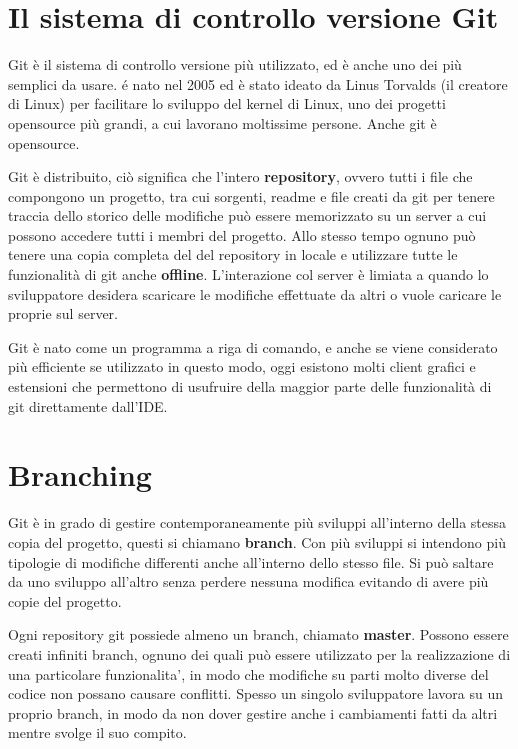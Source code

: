 \documentclass{article} \usepackage[textwidth=18cm,textheight=18cm]{geometry}
\begin{document}
\section{Il sistema di controllo versione Git}

Git è il sistema di controllo versione più utilizzato, ed è anche uno dei più
semplici da usare. é nato nel 2005 ed è stato ideato da Linus Torvalds (il
creatore di Linux) per facilitare lo sviluppo del kernel di Linux, uno dei
progetti opensource più grandi, a cui lavorano moltissime persone. Anche git è
opensource.

Git è distribuito, ciò significa che l'intero \textbf{repository}, ovvero
tutti i file che compongono un progetto, tra cui sorgenti, readme e file creati
da git per tenere traccia dello storico delle modifiche può essere memorizzato
su un server a cui possono accedere tutti i membri del progetto. Allo stesso
tempo ognuno può tenere una copia completa del del repository in locale e
utilizzare tutte le funzionalità di git anche \textbf{offline}. L'interazione col server
è limiata a quando lo sviluppatore desidera scaricare le modifiche effettuate da
altri o vuole caricare le proprie sul server.

Git è nato come un programma a riga di comando, e anche se viene considerato più
efficiente se utilizzato in questo modo, oggi esistono molti client grafici e
estensioni che permettono di usufruire della maggior parte delle funzionalità di
git direttamente dall'IDE.

\section{Branching}

Git è in grado di gestire contemporaneamente più sviluppi all'interno della
stessa copia del progetto, questi si chiamano \textbf{branch}. Con più sviluppi si 
intendono più tipologie di modifiche differenti anche all'interno dello stesso file.
Si può saltare da uno sviluppo all'altro senza perdere nessuna modifica
evitando di avere più copie del progetto.

Ogni repository git possiede almeno un branch, chiamato \textbf{master}.
Possono essere creati infiniti branch, ognuno dei quali può essere utilizzato
per la realizzazione di una particolare funzionalita', in modo che modifiche su parti
molto diverse del codice non possano causare conflitti. Spesso un singolo
sviluppatore lavora su un proprio branch, in modo da non dover gestire anche i
cambiamenti fatti da altri mentre svolge il suo compito. 
\end{document}
